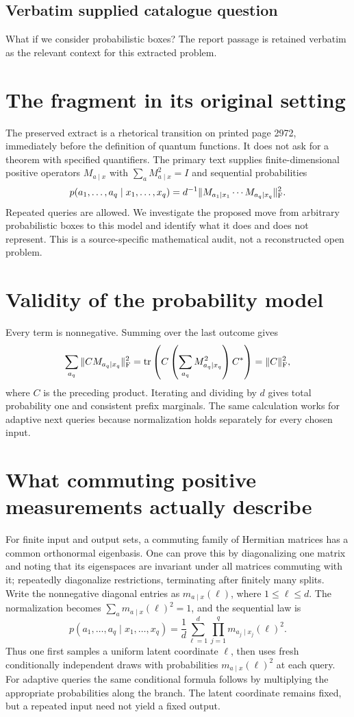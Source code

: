 \documentclass[11pt]{article}
\begin{document}
\subsection{Verbatim supplied catalogue question}
What if we consider probabilistic boxes? The report passage is retained verbatim as the relevant context for this extracted problem.

\section{The fragment in its original setting}
The preserved extract is a rhetorical transition on printed page
2972, immediately before the definition of quantum functions.
It does not ask for a theorem with specified quantifiers. The
primary text supplies finite-dimensional positive operators
$M_{a\mid x}$ with $\sum_aM_{a\mid x}^2=I$ and sequential
probabilities
\[
 p(a_1,\ldots,a_q\mid x_1,\ldots,x_q)
 =d^{-1}\|M_{a_1\mid x_1}\cdots M_{a_q\mid x_q}\|_{\rm F}^2.
\]
Repeated queries are allowed. We investigate the proposed move
from arbitrary probabilistic boxes to this model and identify
what it does and does not represent. This is a source-specific
mathematical audit, not a reconstructed open problem.

\section{Validity of the probability model}
Every term is nonnegative. Summing over the last outcome gives
\[
 \sum_{a_q}\|CM_{a_q\mid x_q}\|_{\rm F}^2
 =\operatorname{tr}\left(C\left(\sum_{a_q}M_{a_q\mid x_q}^2\right)C^*\right)
 =\|C\|_{\rm F}^2,
\]
where $C$ is the preceding product. Iterating and dividing by
$d$ gives total probability one and consistent prefix marginals.
The same calculation works for adaptive next queries because
normalization holds separately for every chosen input.

\section{What commuting positive measurements actually describe}
For finite input and output sets, a commuting family of Hermitian
matrices has a common orthonormal eigenbasis. One can prove this
by diagonalizing one matrix and noting that its eigenspaces are
invariant under all matrices commuting with it; repeatedly
diagonalize restrictions, terminating after finitely many splits.
Write the nonnegative diagonal entries as $m_{a\mid x}(\ell)$,
where $1\le\ell\le d$. The normalization becomes
$\sum_a m_{a\mid x}(\ell)^2=1$, and the sequential law is
\[
 p(a_1,\ldots,a_q\mid x_1,\ldots,x_q)
 =\frac1d\sum_{\ell=1}^d\prod_{j=1}^q m_{a_j\mid x_j}(\ell)^2.
\]
Thus one first samples a uniform latent coordinate $\ell$, then
uses fresh conditionally independent draws with probabilities
$m_{a\mid x}(\ell)^2$ at each query. For adaptive queries the
same conditional formula follows by multiplying the appropriate
probabilities along the branch. The latent coordinate remains
fixed, but a repeated input need not yield a fixed output.
\end{document}
